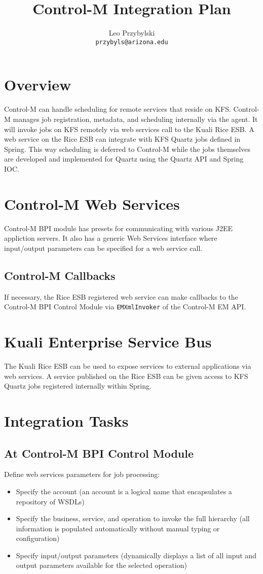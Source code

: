 \documentclass[12pt,notitlepage]{article}
\author{Leo Przybylski \\
\texttt{przybyls@arizona.edu}}
\title{Control-M Integration Plan}
\begin{document}
\tableofcontents
\maketitle

\section{Overview}

Control-M can handle scheduling for remote services that reside on KFS. Control-M manages job registration,
metadata, and scheduling internally via the agent. It will invoke jobs on KFS remotely via web services call 
to the Kuali Rice ESB. A web service on the Rice ESB can integrate with KFS Quartz jobs defined in Spring. This way
scheduling is deferred to Control-M while the jobs themselves are developed and implemented for Quartz using the 
Quartz API and Spring IOC.

\section{Control-M Web Services}

Control-M BPI module has presets for communicating with various J2EE appliction servers. It also has 
a generic Web Services interface where input/output parameters can be specified for a web service call.


\subsection{Control-M Callbacks}
If necessary, the Rice ESB registered web service can make callbacks to the Control-M BPI Control Module via
\verb|EMXmlInvoker| of the Control-M EM API.

\section{Kuali Enterprise Service Bus}
The Kuali Rice ESB can be used to expose services to external applications via web services. A service
published on the Rice ESB can be given access to KFS Quartz jobs registered internally within Spring.

\section{Integration Tasks}
\subsection{At Control-M BPI Control Module}
Define web services parameters for job processing:
\begin{itemize}
\item Specify the account (an account is a logical name that encapsulates a repository of WSDLs) 
\item Specify the business, service, and operation to invoke the full hierarchy (all information is populated automatically without manual typing or configuration)
\item Specify input/output parameters (dynamically displays a list of all input and output parameters available for the selected operation)
\end{itemize}
\end{document}
